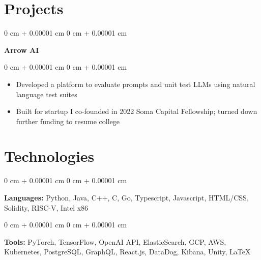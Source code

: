 \documentclass[10pt, letterpaper]{article}
\newenvironment{highlights}{
    \begin{itemize}[
        topsep=0.10 cm,
        parsep=0.10 cm,
        partopsep=0pt,
        itemsep=0pt,
        leftmargin=0 cm + 10pt
    ]
}{
    \end{itemize}
} %
\newenvironment{onecolentry}{
    \begin{adjustwidth}{
        0 cm + 0.00001 cm
    }{
        0 cm + 0.00001 cm
    }
}{
    \end{adjustwidth}
} %
\newenvironment{twocolentry}[2][]{
    \onecolentry
    \def\secondColumn{#2}
    \setcolumnwidth{\fill, 4.5 cm}
    \begin{paracol}{2}
}{
    \switchcolumn \raggedleft \secondColumn
    \end{paracol}
    \endonecolentry
} %
\begin{document}
    
    \section{Projects}



        
        \begin{twocolentry}{
        }
            \textbf{Arrow AI}\end{twocolentry}

        \vspace{0.10 cm}
        \begin{onecolentry}
            \begin{highlights}
                \item Developed a platform to evaluate prompts and unit test LLMs using natural language test suites
                \item Built for startup I co-founded in 2022 Soma Capital Fellowship; turned down further funding to resume college
            \end{highlights}
        \end{onecolentry}



    
    \section{Technologies}



        
        \begin{onecolentry}
            \textbf{Languages:} Python, Java, C++, C, Go, Typescript, Javascript, HTML/CSS, Solidity, RISC-V, Intel x86
        \end{onecolentry}

        \begin{onecolentry}
            \textbf{Tools:} PyTorch, TensorFlow, OpenAI API, ElasticSearch, GCP, AWS, Kubernetes, PostgreSQL, GraphQL, React.js, DataDog, Kibana, Unity, LaTeX
        \end{onecolentry}


    
\end{document}
